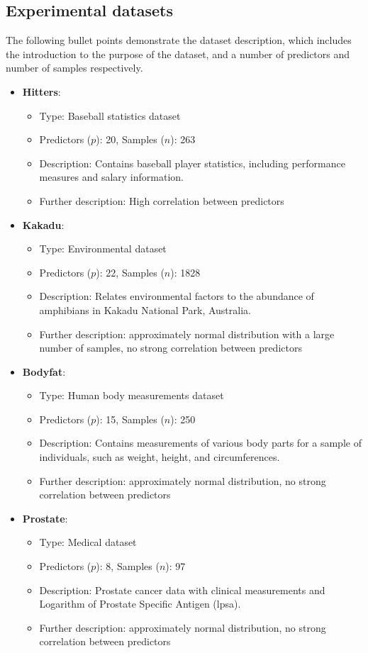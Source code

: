 \subsection{Experimental datasets}
The following bullet points demonstrate the dataset description, which includes the introduction to the purpose of the dataset, and a number of predictors and number of samples respectively.
\begin{itemize}
	
	\item \textbf{Hitters}:
	\begin{itemize}
		\item Type: Baseball statistics dataset
		\item Predictors ($p$): 20, Samples ($n$): 263
		\item Description: Contains baseball player statistics, including performance measures and salary information.
		\item Further description: High correlation between predictors
	\end{itemize}
	
	\item \textbf{Kakadu}:
	\begin{itemize}
		\item Type: Environmental dataset
		\item Predictors ($p$): 22, Samples ($n$): 1828
		\item Description: Relates environmental factors to the abundance of amphibians in Kakadu National Park, Australia.
		\item Further description: approximately normal distribution with a large number of samples, no strong correlation between predictors
	\end{itemize}
	
	\item \textbf{Bodyfat}:
	\begin{itemize}
		\item Type: Human body measurements dataset
		\item Predictors ($p$): 15, Samples ($n$): 250
		\item Description: Contains measurements of various body parts for a sample of individuals, such as weight, height, and circumferences.
		\item Further description: approximately normal distribution, no strong correlation between predictors
	\end{itemize}
	\item \textbf{Prostate}:
	\begin{itemize}
		\item Type: Medical dataset
		\item Predictors ($p$): 8, Samples ($n$): 97
		\item Description: Prostate cancer data with clinical measurements and Logarithm of Prostate Specific Antigen (lpsa).
		\item Further description: approximately normal distribution, no strong correlation between predictors
	\end{itemize}
	

\end{itemize}
